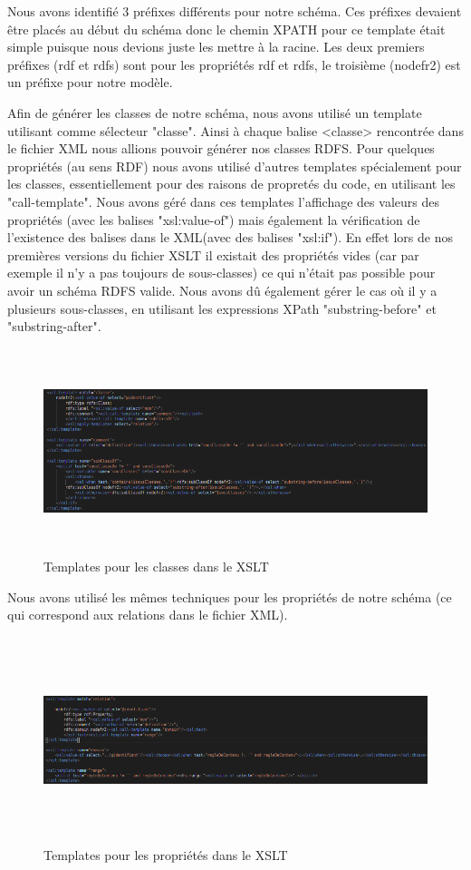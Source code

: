 \documentclass{article}
\begin{document}
Nous avons identifié 3 préfixes différents pour notre schéma. Ces préfixes devaient être placés au début du schéma donc le chemin XPATH pour ce template était simple puisque nous devions juste les mettre à la racine. Les deux premiers préfixes (rdf et rdfs) sont pour les propriétés rdf et rdfs, le troisième (nodefr2) est un préfixe pour notre modèle.

Afin de générer les classes de notre schéma, nous avons utilisé un template utilisant comme sélecteur "classe". Ainsi à chaque balise <classe> rencontrée dans le fichier XML nous allions pouvoir générer nos classes RDFS. Pour quelques propriétés (au sens RDF) nous avons utilisé d'autres templates spécialement pour les classes, essentiellement pour des raisons de propretés du code, en utilisant les "call-template". Nous avons géré dans ces templates l'affichage des valeurs des propriétés (avec les balises "xsl:value-of") mais également la vérification de l'existence des balises dans le XML(avec des balises "xsl:if"). En effet lors de nos premières versions du fichier XSLT il existait des propriétés vides (car par exemple il n'y a pas toujours de sous-classes) ce qui n'était pas possible pour avoir un schéma RDFS valide. Nous avons dû également gérer le cas où il y a plusieurs sous-classes, en utilisant les expressions XPath "substring-before" et "substring-after".

\begin{figure}[!ht]
    \center
    \centerline{\includegraphics[scale=0.5,width=18cm, height=6cm]{img/temp_classes}}
    \caption{Templates pour les classes dans le XSLT}
\end{figure}

Nous avons utilisé les mêmes techniques pour les propriétés de notre schéma (ce qui correspond aux relations dans le fichier XML).

\begin{figure}[!ht]
    \center
    \centerline{\includegraphics[scale=0.5,width=19cm, height=6cm]{img/temp_proprietes}}
    \caption{Templates pour les propriétés dans le XSLT}
\end{figure}
\end{document}
